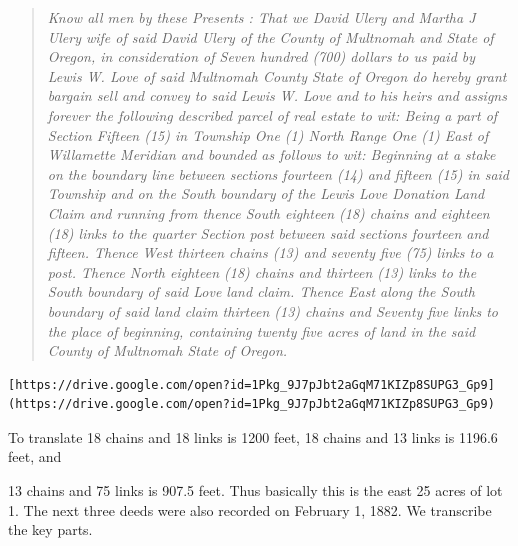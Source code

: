 \documentclass[
  12pt,
]{book}
\begin{document}
\begin{quote}
\emph{Know all men by these Presents : That we David Ulery and Martha J Ulery wife of said David Ulery of the County of Multnomah and State of Oregon, in consideration of Seven hundred (700) dollars to us paid by Lewis W. Love of said Multnomah County State of Oregon do hereby grant bargain sell and convey to said Lewis W. Love and to his heirs and assigns forever the following described parcel of real estate to wit: Being a part of Section Fifteen (15) in Township One (1) North Range One (1) East of Willamette Meridian and bounded as follows to wit: Beginning at a stake on the boundary line between sections fourteen (14) and fifteen (15) in said Township and on the South boundary of the Lewis Love Donation Land Claim and running from thence South eighteen (18) chains and eighteen (18) links to the quarter Section post between said sections fourteen and fifteen. Thence West thirteen chains (13) and seventy five (75) links to a post. Thence North eighteen (18) chains and thirteen (13) links to the South boundary of said Love land claim. Thence East along the South boundary of said land claim thirteen (13) chains and Seventy five links to the place of beginning, containing twenty five acres of land in the said County of Multnomah State of Oregon.}
\end{quote}

\begin{verbatim}
[https://drive.google.com/open?id=1Pkg_9J7pJbt2aGqM71KIZp8SUPG3_Gp9](https://drive.google.com/open?id=1Pkg_9J7pJbt2aGqM71KIZp8SUPG3_Gp9)
\end{verbatim}

To translate 18 chains and 18 links is 1200 feet, 18 chains and 13 links is 1196.6 feet, and

13 chains and 75 links is 907.5 feet. Thus basically this is the east 25 acres of lot 1. The next three deeds were also recorded on February 1, 1882. We transcribe the key parts.
\end{document}
